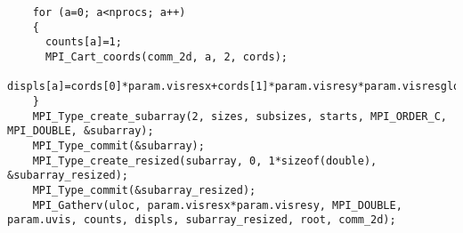\begin{frame}[fragile]
  \begin{lstlisting}
    for (a=0; a<nprocs; a++)
    {
      counts[a]=1;
      MPI_Cart_coords(comm_2d, a, 2, cords);
      displs[a]=cords[0]*param.visresx+cords[1]*param.visresy*param.visresglobx;
    }
    MPI_Type_create_subarray(2, sizes, subsizes, starts, MPI_ORDER_C, MPI_DOUBLE, &subarray);
    MPI_Type_commit(&subarray);
    MPI_Type_create_resized(subarray, 0, 1*sizeof(double), &subarray_resized);
    MPI_Type_commit(&subarray_resized);
    MPI_Gatherv(uloc, param.visresx*param.visresy, MPI_DOUBLE, param.uvis, counts, displs, subarray_resized, root, comm_2d);
  \end{lstlisting}
\end{frame}
